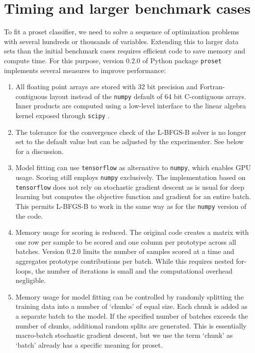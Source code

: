 \section{Timing and larger benchmark cases}
\label{sec_timing_larger_cases}
%
\begin{center}\end{center}
%
To fit a proset classifier, we need to solve a sequence of optimization problems with several hundreds or thousands of variables.
Extending this to larger data sets than the initial benchmark cases requires efficient code to save memory and compute time.
For this purpose, version 0.2.0 of Python package \texttt{proset} implements several measures to improve performance:
%
\begin{enumerate}
\item All floating point arrays are stored with 32 bit precision and Fortran-contiguous layout instead of the \texttt{numpy} \cite{Harris_20} default of 64 bit C-contiguous arrays.
Inner products are computed using a low-level interface to the linear algebra kernel exposed through \texttt{scipy} \cite{Virtanen_20}.
%
\item The tolerance for the convergence check of the L-BFGS-B solver is no longer set to the default value but can be adjusted by the experimenter.
See below for a discussion.
%
\item Model fitting can use \texttt{tensorflow} \cite{Abadi_15} as alternative to \texttt{numpy}, which enables GPU usage.
Scoring still employs \texttt{numpy} exclusively.
The implementation based on \texttt{tensorflow} does not rely on stochastic gradient descent as is usual for deep learning but computes the objective function and gradient for an entire batch.
This permits L-BFGS-B to work in the same way as for the \texttt{numpy} version of the code.
%
\item Memory usage for scoring is reduced.
The original code creates a matrix with one row per sample to be scored and one column per prototype across all batches.
Version 0.2.0 limits the number of samples scored at a time and aggregates prototype contributions per batch.
While this requires nested for-loops, the number of iterations is small and the computational overhead negligible.
%
\item Memory usage for model fitting can be controlled by randomly splitting the training data into a number of `chunks' of equal size.
Each chunk is added as a separate batch to the model.
If the specified number of batches exceeds the number of chunks, additional random splits are generated.
This is essentially macro-batch stochastic gradient descent, but we use the term `chunk' as `batch' already has a specific meaning for proset.
\end{enumerate}
